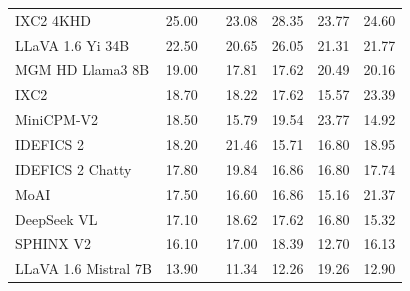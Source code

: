 \begin{table}[h]
{\begin{tabular}{lalcccc@{}}
IXC2 4KHD \cite{dong2024internlmxcomposer24khd} & 25.00 &  & 23.08 & 28.35 & 23.77 & 24.60 \\
LLaVA 1.6 Yi 34B \cite{liu2024llavanext} & 22.50 &  & 20.65 & 26.05 & 21.31 & 21.77 \\
MGM HD Llama3 8B \cite{li2024minigemini} & 19.00 &  & 17.81 & 17.62 & 20.49 & 20.16 \\
IXC2 \cite{chen2023internvl} & 18.70 &  & 18.22 & 17.62 & 15.57 & 23.39 \\
MiniCPM-V2 \cite{viscpm} & 18.50 &  & 15.79 & 19.54 & 23.77 & 14.92 \\
IDEFICS 2 \cite{laurenccon2024matters} & 18.20 &  & 21.46 & 15.71 & 16.80 & 18.95 \\
IDEFICS 2 Chatty \cite{laurenccon2024matters} & 17.80 &  & 19.84 & 16.86 & 16.80 & 17.74 \\
MoAI \cite{lee2024moai} & 17.50 &  & 16.60 & 16.86 & 15.16 & 21.37 \\
DeepSeek VL \cite{lu2024deepseekvl} & 17.10 &  & 18.62 & 17.62 & 16.80 & 15.32 \\
SPHINX V2 \cite{gao2024sphinxx} & 16.10 &  & 17.00 & 18.39 & 12.70 & 16.13 \\
LLaVA 1.6 Mistral 7B \cite{liu2024llavanext} & 13.90 &  & 11.34 & 12.26 & 19.26 & 12.90 \\
    \bottomrule
    \hline
    
  \end{tabular}
  }
  
  \label{tab:val_reas_set_year}
\end{table}
